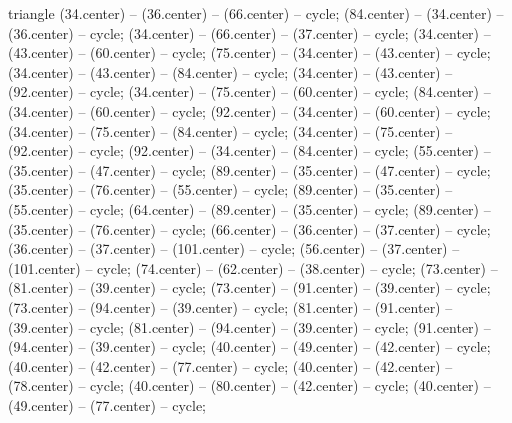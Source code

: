 {\begin{pgfonlayer}{triangle}
 (34.center) -- (36.center) -- (66.center) -- cycle; 
 (84.center) -- (34.center) -- (36.center) -- cycle; 
 (34.center) -- (66.center) -- (37.center) -- cycle; 
 (34.center) -- (43.center) -- (60.center) -- cycle; 
 (75.center) -- (34.center) -- (43.center) -- cycle; 
 (34.center) -- (43.center) -- (84.center) -- cycle; 
 (34.center) -- (43.center) -- (92.center) -- cycle; 
 (34.center) -- (75.center) -- (60.center) -- cycle; 
 (84.center) -- (34.center) -- (60.center) -- cycle; 
 (92.center) -- (34.center) -- (60.center) -- cycle; 
 (34.center) -- (75.center) -- (84.center) -- cycle; 
 (34.center) -- (75.center) -- (92.center) -- cycle; 
 (92.center) -- (34.center) -- (84.center) -- cycle; 
 (55.center) -- (35.center) -- (47.center) -- cycle; 
 (89.center) -- (35.center) -- (47.center) -- cycle; 
 (35.center) -- (76.center) -- (55.center) -- cycle; 
 (89.center) -- (35.center) -- (55.center) -- cycle; 
 (64.center) -- (89.center) -- (35.center) -- cycle; 
 (89.center) -- (35.center) -- (76.center) -- cycle; 
 (66.center) -- (36.center) -- (37.center) -- cycle; 
 (36.center) -- (37.center) -- (101.center) -- cycle; 
 (56.center) -- (37.center) -- (101.center) -- cycle; 
 (74.center) -- (62.center) -- (38.center) -- cycle; 
 (73.center) -- (81.center) -- (39.center) -- cycle; 
 (73.center) -- (91.center) -- (39.center) -- cycle; 
 (73.center) -- (94.center) -- (39.center) -- cycle; 
 (81.center) -- (91.center) -- (39.center) -- cycle; 
 (81.center) -- (94.center) -- (39.center) -- cycle; 
 (91.center) -- (94.center) -- (39.center) -- cycle; 
 (40.center) -- (49.center) -- (42.center) -- cycle; 
 (40.center) -- (42.center) -- (77.center) -- cycle; 
 (40.center) -- (42.center) -- (78.center) -- cycle; 
 (40.center) -- (80.center) -- (42.center) -- cycle; 
 (40.center) -- (49.center) -- (77.center) -- cycle; 

\end{pgfonlayer}}
